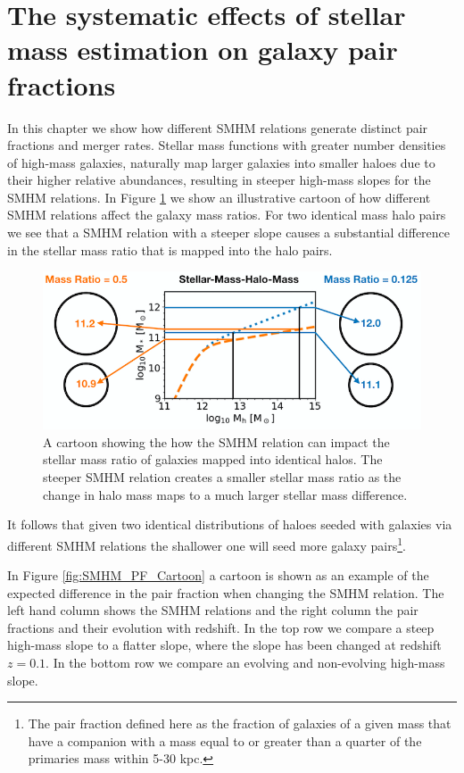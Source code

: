 \section{The systematic effects of stellar mass estimation on galaxy pair fractions}


In this chapter we show how different SMHM relations generate distinct pair fractions and merger rates. 
Stellar mass functions with greater number densities of high-mass galaxies, naturally map larger galaxies into smaller haloes due to their higher relative abundances, resulting in steeper high-mass slopes for the SMHM relations.
In Figure \ref{fig:MassRatioCartoon} we show an illustrative cartoon of how different SMHM relations affect the galaxy mass ratios. 
For two identical mass halo pairs we see that a SMHM relation with a steeper slope causes a substantial difference in the stellar mass ratio that is mapped into the halo pairs. 

\begin{figure}[h]
	\centering
	\includegraphics[width = \linewidth]{Figures/Chapter5/MassRatioCartoon.png}
	\caption{A cartoon showing the how the SMHM relation can impact the stellar mass ratio of galaxies mapped into identical halos. The steeper SMHM relation creates a smaller stellar mass ratio as the change in halo mass maps to a much larger stellar mass difference.}
	\label{fig:MassRatioCartoon}
\end{figure}

It follows that given two identical distributions of haloes seeded with galaxies via different SMHM relations the shallower one will seed more galaxy pairs\footnote{The pair fraction  defined here as the fraction of galaxies of a given mass that have a companion with a mass equal to or greater than a quarter of the primaries mass within 5-30 kpc.}.

In Figure \ref{fig:SMHM_PF_Cartoon} a cartoon is shown as an example of the expected difference in the pair fraction when changing the SMHM relation.
The left hand column shows the SMHM relations and the right column the pair fractions and their evolution with redshift. 
In the top row we compare a steep high-mass slope to a flatter slope, where the slope has been changed at redshift $z = 0.1$.
In the bottom row we compare an evolving and non-evolving high-mass slope.

